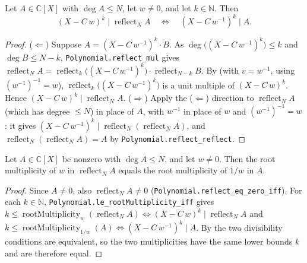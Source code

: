 \begin{lemma}
    \label{lem:dvd-reflect-transport}
    \leanok
    Let $A \in \mathbb{C}[X]$ with $\deg A \le N$, let $w \neq 0$, and let
    $k \in \mathbb{N}$. Then
    \[
        (X - C\,w)^{k} \mid \operatorname{reflect}_N A
        \quad\Longleftrightarrow\quad
        (X - C\,w^{-1})^{k} \mid A .
    \]
\end{lemma}
\begin{proof}
    ($\Leftarrow$) Suppose $A = (X - C\,w^{-1})^{k}\cdot B$. As
    $\deg\bigl((X - C\,w^{-1})^{k}\bigr) \le k$ and $\deg B \le N - k$,
    \texttt{Polynomial.reflect\_mul} gives $\operatorname{reflect}_N A
    = \operatorname{reflect}_k\bigl((X - C\,w^{-1})^{k}\bigr)\cdot
    \operatorname{reflect}_{N-k} B$. By  (with
    $v = w^{-1}$, using $(w^{-1})^{-1} = w$),
    $\operatorname{reflect}_k\bigl((X - C\,w^{-1})^{k}\bigr)$ is a unit multiple
    of $(X - C\,w)^{k}$. Hence
    $(X - C\,w)^{k} \mid \operatorname{reflect}_N A$.
    ($\Rightarrow$) Apply the ($\Leftarrow$) direction to
    $\operatorname{reflect}_N A$ (which has degree $\le N$) in place of $A$, with
    $w^{-1}$ in place of $w$ and $(w^{-1})^{-1} = w$: it gives
    $(X - C\,w^{-1})^{k} \mid \operatorname{reflect}_N(\operatorname{reflect}_N A)$,
    and $\operatorname{reflect}_N(\operatorname{reflect}_N A) = A$ by
    \texttt{Polynomial.reflect\_reflect}.
\end{proof}

\begin{lemma}
    \label{lem:rootmult-reflect}
    \leanok
    Let $A \in \mathbb{C}[X]$ be nonzero with $\deg A \le N$, and let $w \neq 0$.
    Then the root multiplicity of $w$ in $\operatorname{reflect}_N A$ equals the
    root multiplicity of $1/w$ in $A$.
\end{lemma}
\begin{proof}
    Since $A \neq 0$, also $\operatorname{reflect}_N A \neq 0$
    (\texttt{Polynomial.reflect\_eq\_zero\_iff}). For each $k \in \mathbb{N}$,
    \texttt{Polynomial.le\_rootMultiplicity\_iff} gives
    $k \le \operatorname{rootMultiplicity}_w(\operatorname{reflect}_N A)
    \iff (X - C\,w)^{k} \mid \operatorname{reflect}_N A$ and
    $k \le \operatorname{rootMultiplicity}_{1/w}(A)
    \iff (X - C\,w^{-1})^{k} \mid A$. By  the two
    divisibility conditions are equivalent, so the two multiplicities have the
    same lower bounds $k$ and are therefore equal.
\end{proof}

